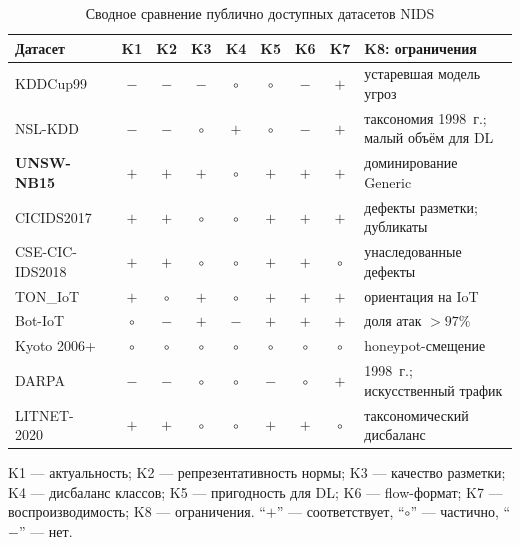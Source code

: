\begin{table}[H]
\centering
\caption{Сводное сравнение публично доступных датасетов NIDS}
\label{tab:datasets-compare}
\renewcommand{\arraystretch}{1.2}
\setlength{\tabcolsep}{3pt}
\small
\begin{tabularx}{\linewidth}{@{}lcccccccX@{}}
\toprule
\textbf{Датасет} & \textbf{K1} & \textbf{K2} & \textbf{K3} & \textbf{K4} &
\textbf{K5} & \textbf{K6} & \textbf{K7} & \textbf{K8: ограничения} \\
\midrule
KDDCup99~\cite{tavallaee2009nslkdd}            & $-$    & $-$ & $-$ & $\circ$ & $\circ$ & $-$    & $+$ & устаревшая модель угроз \\
NSL-KDD~\cite{tavallaee2009nslkdd}             & $-$    & $-$ & $\circ$ & $+$ & $\circ$ & $-$    & $+$ & таксономия 1998~г.; малый объём для DL \\
\textbf{UNSW-NB15}~\cite{moustafa2015unsw}     & $+$    & $+$ & $+$ & $\circ$ & $+$    & $+$    & $+$ & доминирование Generic \\
CICIDS2017~\cite{sharafaldin2018toward}        & $+$    & $+$ & $\circ$ & $\circ$ & $+$    & $+$    & $+$ & дефекты разметки; дубликаты \\
CSE-CIC-IDS2018~\cite{sharafaldin2018toward}   & $+$    & $+$ & $\circ$ & $\circ$ & $+$    & $+$    & $\circ$ & унаследованные дефекты \\
TON\_IoT~\cite{moustafa2021toniot}             & $+$    & $\circ$ & $+$ & $\circ$ & $+$    & $+$    & $+$ & ориентация на IoT \\
Bot-IoT~\cite{koroniotis2019botiot}            & $\circ$& $-$ & $+$ & $-$    & $+$    & $+$    & $+$ & доля атак $>97\%$ \\
Kyoto 2006+~\cite{song2011kyoto}               & $\circ$& $\circ$ & $\circ$ & $\circ$ & $\circ$ & $\circ$ & $\circ$ & honeypot-смещение \\
DARPA~\cite{lippmann2000darpa}                 & $-$    & $-$ & $\circ$ & $\circ$ & $-$    & $\circ$ & $+$ & 1998~г.; искусственный трафик \\
LITNET-2020~\cite{damasevicius2020litnet}      & $+$    & $+$ & $\circ$ & $\circ$ & $+$    & $+$    & $\circ$ & таксономический дисбаланс \\
\bottomrule
\end{tabularx}
\end{table}

\noindent
K1 --- актуальность; K2 --- репрезентативность нормы;
K3 --- качество разметки; K4 --- дисбаланс классов;
K5 --- пригодность для DL; K6 --- flow-формат;
K7 --- воспроизводимость; K8 --- ограничения.
``$+$'' --- соответствует, ``$\circ$'' --- частично, ``$-$'' --- нет.

